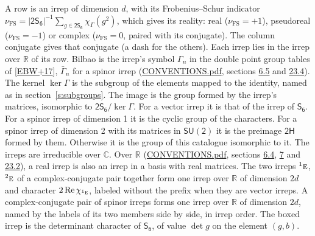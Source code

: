 \documentclass[10pt,a4paper]{article}
\numberwithin{equation}{section}
\newcommand{\grp}[1]{\mathsf{#1}}
\newcommand{\irr}[1]{\text{\normalfont\scshape #1}}
\newcommand{\conjpair}[1]{{}^{#1}}
\newcommand{\irchar}[1]{\chi_{#1}}
\newcommand{\fsind}{\nu_{\mathrm{FS}}}
\begin{document}
\leavevmode\label{n:index.frobenius}\label{n:head.irrep}\label{n:head.reality}A row is an irrep of dimension $d$, with its Frobenius--Schur indicator $\fsind = |\grp{2S_{6}}|^{-1}\allowbreak\sum_{g\in\grp{2S_{6}}}\irchar{\Gamma}(g^2)$, which gives its reality: real ($\fsind = +1$), pseudoreal ($\fsind = -1$) or complex ($\fsind = 0$, paired with its conjugate). \label{n:head.conjugate}The column conjugate gives that conjugate (a dash for the others). \label{n:head.over.real}Each irrep lies in the irrep over $\mathbb{R}$ of its row. \label{n:head.bilbao}\label{n:irrep.alias.gamma}Bilbao is the irrep's symbol $\Gamma_n$ in the double point group tables of [\href{../../../REFERENCES.pdf\#ref.EBW+17}{EBW+17}], $\bar{\Gamma}_n$ for a spinor irrep (\href{../../CONVENTIONS.pdf}{CONVENTIONS.pdf}, sections \href{../../../rotation/CONVENTIONS.pdf\#conv.6.5}{6.5} and \href{../../CONVENTIONS.pdf\#conv.23.4}{23.4}). \label{n:head.kernel}The kernel $\ker\Gamma$ is the subgroup of the elements mapped to the identity, named as in section~\ref{s:subgroups}. \label{n:head.image}The image is the group formed by the irrep's matrices, isomorphic to $\grp{2S_{6}}/\ker\Gamma$. For a vector irrep it is that of the irrep of \href{../../../rotation/data/pdf/S6.pdf}{$\grp{S_{6}}$}. For a spinor irrep of dimension 1 it is the cyclic group of the characters. For a spinor irrep of dimension 2 with its matrices in $\grp{SU(2)}$ it is the preimage $\grp{2H}$ formed by them. Otherwise it is the group of this catalogue isomorphic to it. The irreps are irreducible over $\mathbb{C}$. Over $\mathbb{R}$ (\href{../../CONVENTIONS.pdf}{CONVENTIONS.pdf}, sections \href{../../../rotation/CONVENTIONS.pdf\#conv.6.4}{6.4}, \href{../../../rotation/CONVENTIONS.pdf\#conv.7}{7} and \href{../../CONVENTIONS.pdf\#conv.23.2}{23.2}), a real irrep is also an irrep in a basis with real matrices. The two irreps $\conjpair{1}\irr{e}$, $\conjpair{2}\irr{e}$ of a complex-conjugate pair together form one irrep over $\mathbb{R}$ of dimension $2d$ and character $2\operatorname{Re}\irchar{\conjpair{1}\irr{e}}$, labeled without the prefix when they are vector irreps. A complex-conjugate pair of spinor irreps forms one irrep over $\mathbb{R}$ of dimension $2d$, named by the labels of its two members side by side, in irrep order. \label{n:mark.determinant}The boxed irrep is the determinant character of \href{../../../rotation/data/pdf/S6.pdf}{$\grp{S_{6}}$}, of value $\det g$ on the element $(g, b)$.
\setlength{\emergencystretch}{2em}\par\setlength{\emergencystretch}{0pt}
\end{document}
